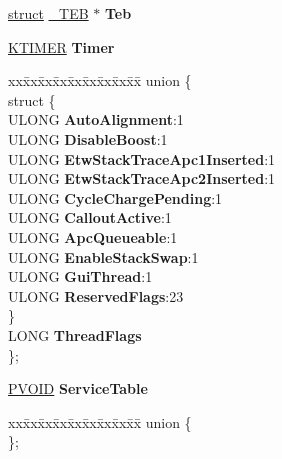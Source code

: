 \begin{DoxyCompactItemize}
\begin{tabbing}
\end{tabbing}\item 
\mbox{\label{struct___k_t_h_r_e_a_d_a06b00ac3edafc8704831dc8edf6c703e}} 
\hyperlink{interfacestruct}{struct} \hyperlink{struct___t_e_b}{\+\_\+\+T\+EB} $\ast$ {\bfseries Teb}
\item 
\mbox{\label{struct___k_t_h_r_e_a_d_ae745879db79e8f33d5538e74b7270879}} 
\hyperlink{struct___k_t_i_m_e_r}{K\+T\+I\+M\+ER} {\bfseries Timer}
\item 
\mbox{\label{struct___k_t_h_r_e_a_d_a7528bcf2d64eb400448025277d12ef6f}} 
\begin{tabbing}
xx\=xx\=xx\=xx\=xx\=xx\=xx\=xx\=xx\=\kill
union \{\\
\mbox{\label{union___k_t_h_r_e_a_d_1_1_0D2096_aca7ab19818b02f54d866adee376f904d}} 
\>struct \{\\
\>\>ULONG {\bfseries AutoAlignment}:1\\
\>\>ULONG {\bfseries DisableBoost}:1\\
\>\>ULONG {\bfseries EtwStackTraceApc1Inserted}:1\\
\>\>ULONG {\bfseries EtwStackTraceApc2Inserted}:1\\
\>\>ULONG {\bfseries CycleChargePending}:1\\
\>\>ULONG {\bfseries CalloutActive}:1\\
\>\>ULONG {\bfseries ApcQueueable}:1\\
\>\>ULONG {\bfseries EnableStackSwap}:1\\
\>\>ULONG {\bfseries GuiThread}:1\\
\>\>ULONG {\bfseries ReservedFlags}:23\\
\>\} \\
\>LONG {\bfseries ThreadFlags}\\
\}; \\

\end{tabbing}\item 
\mbox{\label{struct___k_t_h_r_e_a_d_a8751b148a8f378a33f2ee9872cf196b0}} 
\hyperlink{interfacevoid}{P\+V\+O\+ID} {\bfseries Service\+Table}
\item 
\mbox{\label{struct___k_t_h_r_e_a_d_a8b796d166d1a10633f4406b922a87991}} 
\begin{tabbing}
xx\=xx\=xx\=xx\=xx\=xx\=xx\=xx\=xx\=\kill
union \{\\
\}; \\


\end{tabbing}
\end{DoxyCompactItemize}
